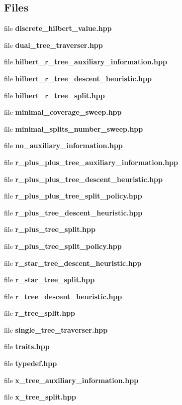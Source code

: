 \subsection*{Files}
\begin{DoxyCompactItemize}
\item 
file \textbf{ discrete\+\_\+hilbert\+\_\+value.\+hpp}
\item 
file \textbf{ dual\+\_\+tree\+\_\+traverser.\+hpp}
\item 
file \textbf{ hilbert\+\_\+r\+\_\+tree\+\_\+auxiliary\+\_\+information.\+hpp}
\item 
file \textbf{ hilbert\+\_\+r\+\_\+tree\+\_\+descent\+\_\+heuristic.\+hpp}
\item 
file \textbf{ hilbert\+\_\+r\+\_\+tree\+\_\+split.\+hpp}
\item 
file \textbf{ minimal\+\_\+coverage\+\_\+sweep.\+hpp}
\item 
file \textbf{ minimal\+\_\+splits\+\_\+number\+\_\+sweep.\+hpp}
\item 
file \textbf{ no\+\_\+auxiliary\+\_\+information.\+hpp}
\item 
file \textbf{ r\+\_\+plus\+\_\+plus\+\_\+tree\+\_\+auxiliary\+\_\+information.\+hpp}
\item 
file \textbf{ r\+\_\+plus\+\_\+plus\+\_\+tree\+\_\+descent\+\_\+heuristic.\+hpp}
\item 
file \textbf{ r\+\_\+plus\+\_\+plus\+\_\+tree\+\_\+split\+\_\+policy.\+hpp}
\item 
file \textbf{ r\+\_\+plus\+\_\+tree\+\_\+descent\+\_\+heuristic.\+hpp}
\item 
file \textbf{ r\+\_\+plus\+\_\+tree\+\_\+split.\+hpp}
\item 
file \textbf{ r\+\_\+plus\+\_\+tree\+\_\+split\+\_\+policy.\+hpp}
\item 
file \textbf{ r\+\_\+star\+\_\+tree\+\_\+descent\+\_\+heuristic.\+hpp}
\item 
file \textbf{ r\+\_\+star\+\_\+tree\+\_\+split.\+hpp}
\item 
file \textbf{ r\+\_\+tree\+\_\+descent\+\_\+heuristic.\+hpp}
\item 
file \textbf{ r\+\_\+tree\+\_\+split.\+hpp}
\item 
file \textbf{ single\+\_\+tree\+\_\+traverser.\+hpp}
\item 
file \textbf{ traits.\+hpp}
\item 
file \textbf{ typedef.\+hpp}
\item 
file \textbf{ x\+\_\+tree\+\_\+auxiliary\+\_\+information.\+hpp}
\item 
file \textbf{ x\+\_\+tree\+\_\+split.\+hpp}
\end{DoxyCompactItemize}
